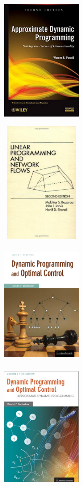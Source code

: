 \documentclass{beamer}
\begin{document}
\begin{frame}
{
	\begin{figure}[!htb]
		\includegraphics[width=4cm, height=6cm]{aproximatesdp.jpg}
	\end{figure}
}
{
	\begin{figure}[!htb]
		\includegraphics[width=4cm, height=6cm]{bazaraa.jpg}
	\end{figure}
}

{
	\begin{figure}[!htb]
		\includegraphics[width=4cm, height=6cm]{bertsekas_0.jpg}
	\end{figure}
}
{
	\begin{figure}[!htb]
		\includegraphics[width=4cm, height=6cm]{bertsekas_1.jpg}
	\end{figure}
}


\end{frame}
\end{document}
